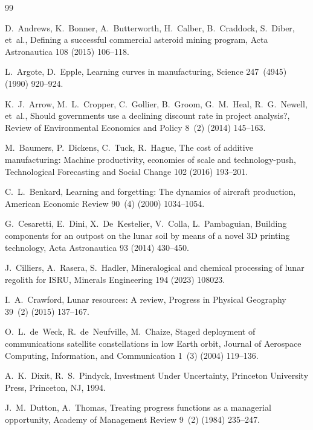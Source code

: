 \documentclass[preprint,12pt]{elsarticle}
\begin{document}
\begin{thebibliography}{99}

D.~Andrews, K.~Bonner, A.~Butterworth, H.~Calber, B.~Craddock, S.~Diber, et~al.,
\newblock Defining a successful commercial asteroid mining program,
\newblock Acta Astronautica 108 (2015) 106--118.

L.~Argote, D.~Epple,
\newblock Learning curves in manufacturing,
\newblock Science 247~(4945) (1990) 920--924.

K.~J.~Arrow, M.~L.~Cropper, C.~Gollier, B.~Groom, G.~M.~Heal, R.~G.~Newell, et~al.,
\newblock Should governments use a declining discount rate in project analysis?,
\newblock Review of Environmental Economics and Policy 8~(2) (2014) 145--163.

M.~Baumers, P.~Dickens, C.~Tuck, R.~Hague,
\newblock The cost of additive manufacturing: Machine productivity, economies of scale and technology-push,
\newblock Technological Forecasting and Social Change 102 (2016) 193--201.

C.~L.~Benkard,
\newblock Learning and forgetting: The dynamics of aircraft production,
\newblock American Economic Review 90~(4) (2000) 1034--1054.

G.~Cesaretti, E.~Dini, X.~De~Kestelier, V.~Colla, L.~Pambaguian,
\newblock Building components for an outpost on the lunar soil by means of a novel 3D printing technology,
\newblock Acta Astronautica 93 (2014) 430--450.

J.~Cilliers, A.~Rasera, S.~Hadler,
\newblock Mineralogical and chemical processing of lunar regolith for ISRU,
\newblock Minerals Engineering 194 (2023) 108023.

I.~A.~Crawford,
\newblock Lunar resources: A review,
\newblock Progress in Physical Geography 39~(2) (2015) 137--167.

O.~L.~de~Weck, R.~de~Neufville, M.~Chaize,
\newblock Staged deployment of communications satellite constellations in low Earth orbit,
\newblock Journal of Aerospace Computing, Information, and Communication 1~(3) (2004) 119--136.

A.~K.~Dixit, R.~S.~Pindyck,
\newblock Investment Under Uncertainty,
\newblock Princeton University Press, Princeton, NJ, 1994.

J.~M.~Dutton, A.~Thomas,
\newblock Treating progress functions as a managerial opportunity,
\newblock Academy of Management Review 9~(2) (1984) 235--247.


\end{thebibliography}
\end{document}
